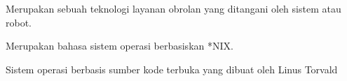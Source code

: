 Merupakan sebuah teknologi layanan obrolan yang ditangani oleh sistem atau robot.

Merupakan bahasa sistem operasi berbasiskan *NIX.

Sistem operasi berbasis sumber kode terbuka yang dibuat oleh Linus Torvald